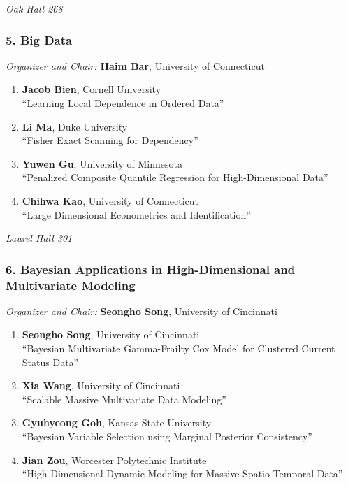 \emph{Oak Hall 268} \\[.5em]

\subsubsection*{5. Big Data}

\emph{Organizer and Chair:} \textbf{Haim Bar}, University of Connecticut

\begin{enumerate}
\item \textbf{Jacob Bien}, Cornell University \\
``Learning Local Dependence in Ordered Data''
\item \textbf{Li Ma}, Duke University \\
``Fisher Exact Scanning for Dependency''
\item \textbf{Yuwen Gu}, University of Minnesota \\
``Penalized Composite Quantile Regression for High-Dimensional Data''
\item \textbf{Chihwa Kao}, University of Connecticut \\
``Large Dimensional Econometrics and Identification''
\end{enumerate}

\emph{Laurel Hall 301} \\[.5em]

\subsubsection*{6. Bayesian Applications in High-Dimensional and Multivariate Modeling}

\emph{Organizer and Chair:} \textbf{Seongho Song}, University of Cincinnati

\begin{enumerate}
\item \textbf{Seongho Song}, University of Cincinnati \\
``Bayesian Multivariate Gamma-Frailty Cox Model for Clustered Current Status Data''
\item \textbf{Xia Wang}, University of Cincinnati \\
``Scalable Massive Multivariate Data Modeling''
\item \textbf{Gyuhyeong Goh}, Kansas State University \\
``Bayesian Variable Selection using Marginal Posterior Consistency''
\item \textbf{Jian Zou}, Worcester Polytechnic Institute \\
``High Dimensional Dynamic Modeling for Massive Spatio-Temporal Data''
\end{enumerate}

